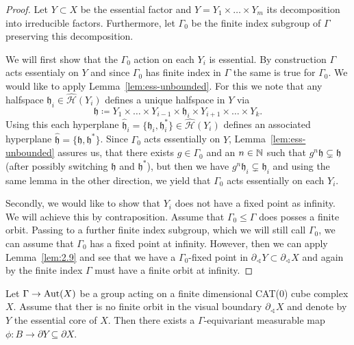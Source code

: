 \begin{proof}
  Let \(Y \subset X\) be the essential factor and \(Y = Y_1 \times \dots \times Y_m\) its decomposition into irreducible factors. Furthermore, let \(\Gamma_0\) be the finite index subgroup of \(\Gamma\) preserving this decomposition.

  We will first show that the \(\Gamma_0\) action on each \(Y_i\) is essential. By construction \(\Gamma\) acts essentialy on \(Y\) and since \(\Gamma_0\) has finite index in \(\Gamma\) the same is true for \(\Gamma_0\). We would like to apply Lemma~\ref{lem:ess-unbounded}. For this we note that any halfspace \(\mathfrak{h}_i \in \mathcal{\hat H}(Y_i)\) defines a unique halfspace in \(Y\) via
  \[
    \mathfrak{h} \coloneqq Y_1 \times \dots \times Y_{i-1} \times \mathfrak{h}_i \times Y_{i+1} \times \dots \times Y_k.
  \]
  Using this each hyperplane \(\mathfrak{\hat h}_i = \{\mathfrak{h}_i , \mathfrak{h}_i^\ast\} \in \mathcal{\hat H}(Y_i)\) defines an associated hyperplane \(\mathfrak{\hat h} = \{\mathfrak{h}, \mathfrak{h}^\ast\}\). Since \(\Gamma_0\) acts essentially on \(Y\), Lemma~\ref{lem:ess-unbounded} assures us, that there exists \(g \in \Gamma_0\) and an \(n \in \mathbb{N}\) such that \(g^n \mathfrak{h} \subsetneq \mathfrak{h}\) (after possibly switching \(\mathfrak{h}\) and \(\mathfrak{h}^\ast\)), but then we have \(g^n \mathfrak{h}_i \subsetneq \mathfrak{h}_i\) and using the same lemma in the other direction, we yield that \(\Gamma_0\) acts essentially on each \(Y_i\).

  Secondly, we would like to show that \(Y_i\) does not have a fixed point as infinity. We will achieve this by contraposition. Assume that \(\Gamma_0 \leq \Gamma\) does posses a finite orbit. Passing to a further finite index subgroup, which we will still call \(\Gamma_0\), we can assume that \(\Gamma_0\) has a fixed point at infinity. However, then we can apply Lemma~\ref{lem:2.9} and see that we have a \(\Gamma_0\)-fixed point in \(\partial_\sphericalangle Y \subset \partial_\sphericalangle X\) and again by the finite index \(\Gamma\) must have a finite orbit at infinity.
\end{proof}

\begin{cor}[\cite{MR3509968}]
  Let \(\Gamma \to \operatorname{Aut}(X)\) be a group acting on a finite dimensional CAT(0) cube complex \(X\). Assume that ther is no finite orbit in the visual boundary \(\partial_\sphericalangle X\) and denote by \(Y\) the essential core of \(X\). Then there exists a \(\Gamma\)-equivariant measurable map \(\phi \colon B \to \partial Y \subseteq \partial X\).
\end{cor}

